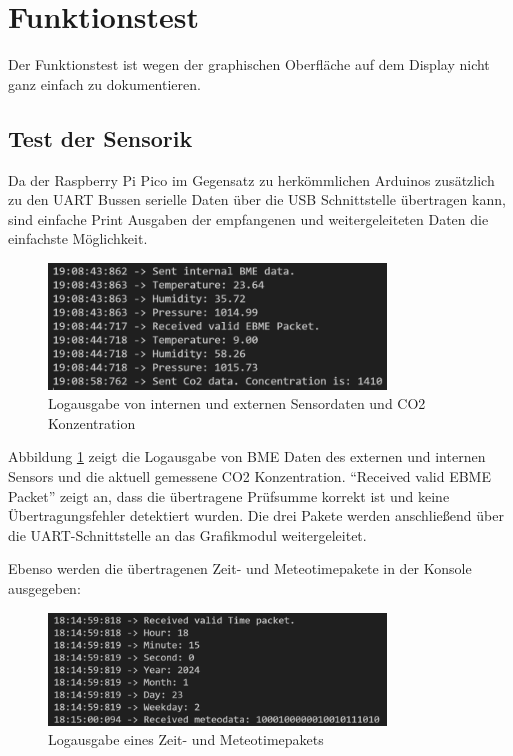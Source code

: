 \documentclass[a4paper,11pt]{article}
\begin{document}
\section{Funktionstest}
\label{sub:funktionstest}

Der Funktionstest ist wegen der graphischen Oberfläche auf dem Display nicht ganz einfach zu dokumentieren. 

\subsection{Test der Sensorik}
\label{subsub:test-sensorik}
Da der Raspberry Pi Pico im Gegensatz zu herkömmlichen Arduinos zusätzlich zu den UART Bussen serielle Daten über die USB Schnittstelle übertragen kann, 
sind einfache Print Ausgaben der empfangenen und weitergeleiteten Daten die einfachste Möglichkeit. 

\begin{figure}[H]
  \centering
  \includegraphics[width=0.8\textwidth]{SensorLog.png}
  \caption{Logausgabe von internen und externen Sensordaten und CO2 Konzentration}
  \label{fig:sensorlog}
\end{figure}

\noindent
Abbildung \ref{fig:sensorlog} zeigt die Logausgabe von BME Daten des externen und internen Sensors und die aktuell gemessene CO2 Konzentration. 
``Received valid EBME Packet'' zeigt an, dass die übertragene Prüfsumme korrekt ist und keine Übertragungsfehler detektiert wurden. 
Die drei Pakete werden anschließend über die UART-Schnittstelle an das Grafikmodul weitergeleitet. 

\vspace{0.2cm}
\noindent
Ebenso werden die übertragenen Zeit- und Meteotimepakete in der Konsole ausgegeben:

\begin{figure}[H]
  \centering
  \includegraphics[width=0.8\textwidth]{MeteotimeLog.png}
  \caption{Logausgabe eines Zeit- und Meteotimepakets}
  \label{fig:meteolog}
\end{figure}
\end{document}
